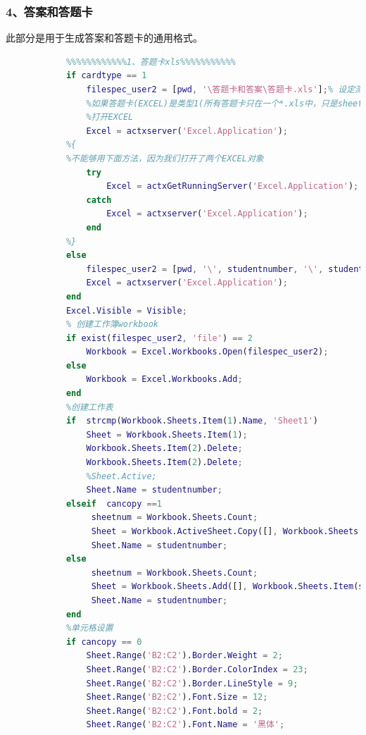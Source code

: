         \subsubsection{4、答案和答题卡}
            此部分是用于生成答案和答题卡的通用格式。
            \begin{lstlisting}[language=Matlab]
            %%%%%%%%%%%%%%%%%创建EXCEL ：答案和答题卡%%%%%%%%%%%%%%%%%%%%
            %%%%%%%%%%%%1、答题卡xls%%%%%%%%%%%
            if cardtype == 1
                filespec_user2 = [pwd, '\答题卡和答案\答题卡.xls'];% 设定测试Excel文件名和路径
                %如果答题卡(EXCEL)是类型1(所有答题卡只在一个*.xls中，只是sheet的名称为学号)
                %打开EXCEL
                Excel = actxserver('Excel.Application');
            %{
            %不能够用下面方法，因为我们打开了两个EXCEL对象
                try
                    Excel = actxGetRunningServer('Excel.Application');
                catch
                    Excel = actxserver('Excel.Application');
                end
            %}
            else
                filespec_user2 = [pwd, '\', studentnumber, '\', studentnumber '.xls'];
                Excel = actxserver('Excel.Application');
            end
            Excel.Visible = Visible;
            % 创建工作簿workbook
            if exist(filespec_user2, 'file') == 2
                Workbook = Excel.Workbooks.Open(filespec_user2);
            else
                Workbook = Excel.Workbooks.Add;
            end
            %创建工作表
            if  strcmp(Workbook.Sheets.Item(1).Name, 'Sheet1')
                Sheet = Workbook.Sheets.Item(1);
                Workbook.Sheets.Item(2).Delete;
                Workbook.Sheets.Item(2).Delete;
                %Sheet.Active;
                Sheet.Name = studentnumber;
            elseif  cancopy ==1
                 sheetnum = Workbook.Sheets.Count;
                 Sheet = Workbook.ActiveSheet.Copy([], Workbook.Sheets.Item(sheetnum));
                 Sheet.Name = studentnumber;
            else
                 sheetnum = Workbook.Sheets.Count;
                 Sheet = Workbook.Sheets.Add([], Workbook.Sheets.Item(sheetnum), 1, []);
                 Sheet.Name = studentnumber;
            end
            %单元格设置
            if cancopy == 0
                Sheet.Range('B2:C2').Border.Weight = 2;
                Sheet.Range('B2:C2').Border.ColorIndex = 23;
                Sheet.Range('B2:C2').Border.LineStyle = 9;
                Sheet.Range('B2:C2').Font.Size = 12;
                Sheet.Range('B2:C2').Font.bold = 2;
                Sheet.Range('B2:C2').Font.Name = '黑体';

\end{lstlisting}
